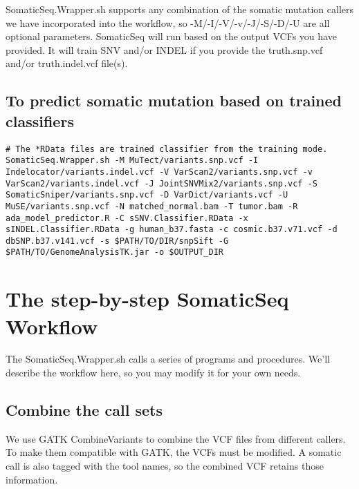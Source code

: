 \documentclass[10pt,letterpaper]{article}
\begin{document}
SomaticSeq.Wrapper.sh supports any combination of the somatic mutation callers we have incorporated into the workflow, so -M/-I/-V/-v/-J/-S/-D/-U are all optional parameters. SomaticSeq will run based on the output VCFs you have provided. It will train SNV and/or INDEL if you provide the truth.snp.vcf and/or truth.indel.vcf file(s).




\subsection{To predict somatic mutation based on trained classifiers}

\begin{lstlisting}
# The *RData files are trained classifier from the training mode.
SomaticSeq.Wrapper.sh -M MuTect/variants.snp.vcf -I Indelocator/variants.indel.vcf -V VarScan2/variants.snp.vcf -v VarScan2/variants.indel.vcf -J JointSNVMix2/variants.snp.vcf -S SomaticSniper/variants.snp.vcf -D VarDict/variants.vcf -U MuSE/variants.snp.vcf -N matched_normal.bam -T tumor.bam -R ada_model_predictor.R -C sSNV.Classifier.RData -x sINDEL.Classifier.RData -g human_b37.fasta -c cosmic.b37.v71.vcf -d dbSNP.b37.v141.vcf -s $PATH/TO/DIR/snpSift -G $PATH/TO/GenomeAnalysisTK.jar -o $OUTPUT_DIR
\end{lstlisting}



\section{The step-by-step SomaticSeq Workflow}

The SomaticSeq.Wrapper.sh calls a series of programs and procedures. We'll describe the workflow here, so you may modify it for your own needs. 


	\subsection{Combine the call sets}
	We use GATK CombineVariants to combine the VCF files from different callers. To make them compatible with GATK, the VCFs must be modified. A somatic call is also tagged with the tool names, so the combined VCF retains those information. 
\end{document}

